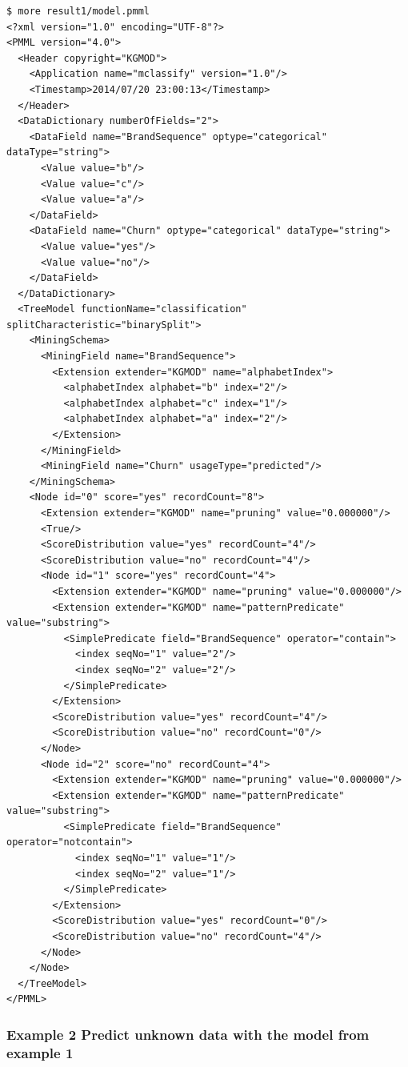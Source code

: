 \begin{Verbatim}[baselinestretch=0.7,frame=single]
$ more result1/model.pmml
<?xml version="1.0" encoding="UTF-8"?>
<PMML version="4.0">
  <Header copyright="KGMOD">
    <Application name="mclassify" version="1.0"/>
    <Timestamp>2014/07/20 23:00:13</Timestamp>
  </Header>
  <DataDictionary numberOfFields="2">
    <DataField name="BrandSequence" optype="categorical" dataType="string">
      <Value value="b"/>
      <Value value="c"/>
      <Value value="a"/>
    </DataField>
    <DataField name="Churn" optype="categorical" dataType="string">
      <Value value="yes"/>
      <Value value="no"/>
    </DataField>
  </DataDictionary>
  <TreeModel functionName="classification" splitCharacteristic="binarySplit">
    <MiningSchema>
      <MiningField name="BrandSequence">
        <Extension extender="KGMOD" name="alphabetIndex">
          <alphabetIndex alphabet="b" index="2"/>
          <alphabetIndex alphabet="c" index="1"/>
          <alphabetIndex alphabet="a" index="2"/>
        </Extension>
      </MiningField>
      <MiningField name="Churn" usageType="predicted"/>
    </MiningSchema>
    <Node id="0" score="yes" recordCount="8">
      <Extension extender="KGMOD" name="pruning" value="0.000000"/>
      <True/>
      <ScoreDistribution value="yes" recordCount="4"/>
      <ScoreDistribution value="no" recordCount="4"/>
      <Node id="1" score="yes" recordCount="4">
        <Extension extender="KGMOD" name="pruning" value="0.000000"/>
        <Extension extender="KGMOD" name="patternPredicate" value="substring">
          <SimplePredicate field="BrandSequence" operator="contain">
            <index seqNo="1" value="2"/>
            <index seqNo="2" value="2"/>
          </SimplePredicate>
        </Extension>
        <ScoreDistribution value="yes" recordCount="4"/>
        <ScoreDistribution value="no" recordCount="0"/>
      </Node>
      <Node id="2" score="no" recordCount="4">
        <Extension extender="KGMOD" name="pruning" value="0.000000"/>
        <Extension extender="KGMOD" name="patternPredicate" value="substring">
          <SimplePredicate field="BrandSequence" operator="notcontain">
            <index seqNo="1" value="1"/>
            <index seqNo="2" value="1"/>
          </SimplePredicate>
        </Extension>
        <ScoreDistribution value="yes" recordCount="0"/>
        <ScoreDistribution value="no" recordCount="4"/>
      </Node>
    </Node>
  </TreeModel>
</PMML>
\end{Verbatim}

\subsubsection{Example 2 Predict unknown data with the model from example 1}

